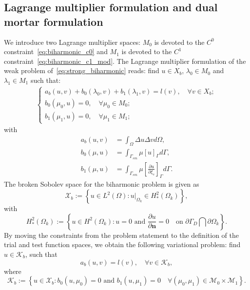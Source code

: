 \documentclass[preprint,12pt]{elsarticle}
\theoremstyle{remark}
\begin{document}
\subsection{Lagrange multiplier formulation and dual mortar formulation}
We introduce two Lagrange multiplier spaces: $M_0$ is devoted to the $C^0$ constraint~\eqref{eq:biharmonic_c0} and $M_1$ is devoted to the $C^1$ constraint~\eqref{eq:biharmonic_c1_mod}. The Lagrange multiplier formulation of the weak problem of~\eqref{eq:strong_biharmonic} reads: find $u\in{X_b}$, $\lambda_0\in{M_0}$ and $\lambda_1\in{M_1}$ such that:
\begin{align}
    \begin{cases}
        a_b(u,v)+b_0(\lambda_0,v)+b_1(\lambda_1,v)=l(v),\quad\forall v\in{X_b};\\
        b_0(\mu_0,u)=0, \quad\forall \mu_0\in{M_0};\\
        b_1(\mu_1,u)=0, \quad\forall \mu_1\in{M_1};
    \end{cases}\label{eq:biharmonic_mixed}
\end{align}
with
\begin{align}
    a_b(u,v)&=\int_\Omega\Delta{u}\Delta{v}d\Omega,\\
    b_0(\mu,u)&=\int_{\Gamma_{sm}}\mu\left[u\right]_{\Gamma}d\Gamma,\\
    b_1(\mu,u)&=\int_{\Gamma_{sm}}\mu\left[\frac{\partial{u}}{\partial\xi_s}\right]_{\Gamma}d\Gamma.
\end{align}
The broken Sobolev space for the biharmonic problem is given as
\begin{equation}
    \mathcal{X}_b:=\left\{u\in{}L^2(\Omega): u\vert_{\Omega_k}\in{}H^2_*(\Omega_k)\right\},
\end{equation}
with 
\begin{equation}
    H^2_*(\Omega_k):=\left\{u\in{}H^2(\Omega_k): u=0 \text{ and }\frac{\partial{u}}{\partial{\mathbf{n}}}=0\quad\text{on } \partial\Gamma_D\bigcap\partial\Omega_k \right\}.
\end{equation}
By moving the constraints from the problem statement to the definition of the trial and test function spaces, we obtain the following variational problem: find $u\in{\mathcal{K}_b}$, such that
\begin{equation}
    a_b(u,v)=l(v), \quad\forall{v\in{\mathcal{K}_b}},\label{eq:biharmonic_kernel}
\end{equation}
where
\begin{equation}
    \mathcal{K}_b:=\left\{u\in{}\mathcal{X}_b: b_0(u, \mu_0)=0 \text{ and }b_1(u, \mu_1)=0\quad\forall(\mu_0,\mu_1)\in{\mathcal{M}_0\times{}\mathcal{M}_1}\right\}.\label{eq:biharmonic_reduced}
\end{equation}
\end{document}
